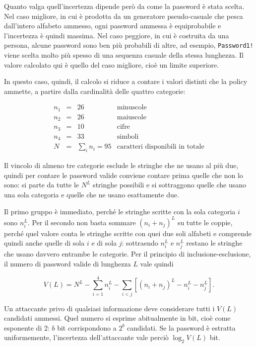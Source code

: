 Quanto valga quell'incertezza dipende però da come la password è stata scelta. Nel caso migliore, in
cui è prodotta da un generatore pseudo-casuale che pesca dall'intero alfabeto ammesso, ogni
password ammessa è equiprobabile e l'incertezza
è quindi massima. Nel caso peggiore, in cui è costruita da una persona, alcune password sono
ben più probabili di altre, ad esempio, \texttt{Password1!} viene scelta molto più spesso di
una sequenza casuale della stessa lunghezza. Il valore calcolato qui è quello del caso migliore, cioè un
limite superiore.

In questo caso, quindi, il calcolo si riduce a contare i valori distinti che la policy ammette, a partire 
dalla cardinalità delle quattro categorie:

\[
\begin{array}{rcll}
n_1 & = & 26  & \mbox{minuscole} \\
n_2 & = & 26  & \mbox{maiuscole} \\
n_3 & = & 10  & \mbox{cifre} \\
n_4 & = & 33  & \mbox{simboli} \\[2pt]
N   & = & \sum_i n_i = 95 & \mbox{caratteri disponibili in totale}
\end{array}
\]

Il vincolo di almeno tre categorie esclude le stringhe che ne usano al più due, quindi per contare le
password valide conviene contare prima quelle che non lo sono: si parte da tutte le $N^L$ stringhe
possibili e si sottraggono quelle che usano una sola categoria e quelle che ne usano esattamente due.

Il primo gruppo è immediato, perché le stringhe scritte con la sola categoria $i$ sono $n_i^L$. Per
il secondo non basta sommare $(n_i + n_j)^L$ su tutte le coppie, perché quel valore conta le stringhe
scritte con quei due soli alfabeti e comprende quindi anche quelle di sola $i$ e di sola $j$:
sottraendo $n_i^L$ e $n_j^L$ restano le stringhe che usano davvero entrambe le categorie. Per il
principio di inclusione-esclusione, il numero di password valide di lunghezza $L$ vale quindi

\[
V(L) = N^L - \sum_{i=1}^{4} n_i^L
       - \sum_{i<j} \left[ (n_i + n_j)^L - n_i^L - n_j^L \right].
\]

Un attaccante privo di qualsiasi informazione deve considerare tutti i $V(L)$ candidati ammessi.
Quel numero si esprime abitualmente in bit, cioè come esponente di 2: $b$ bit corrispondono a $2^b$
candidati. Se la password è estratta uniformemente, l'incertezza dell'attaccante vale perciò 
$\log_2 V(L)$ bit. 

